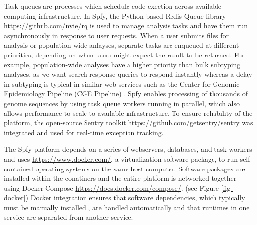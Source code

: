 \documentclass[a4,center,fleqn]{NAR}
\begin{document}
Task queues are processes which schedule code exection across available computing infrastructure.
In Spfy, the Python-based Redis Queue library \url{https://github.com/nvie/rq} is used to manage analysis tasks and have them run asynchronously in response to user requests.
When a user submits files for analysis or population-wide anlayses, separate tasks are enqueued at different priorities, depending on when users might expect the result to be returned.
For example, population-wide analyses have a higher priority than bulk subtyping analyses, as we want search-response queries to respond instantly whereas a delay in subtyping is typical in similar web services such as the Center for Genomic Epidemiology Pipeline (CGE Pipeline) \cite{thomsen2016bacterial}.
Spfy enables processing of thousands of genome sequences by using task queue workers running in parallel, which also allows performance to scale to available infrastructure.
To ensure reliability of the platform, the open-source Sentry toolkit \url{https://github.com/getsentry/sentry} was integrated and used for real-time exception tracking.



The Spfy platform depends on a series of webservers, databases, and task workers and uses \url{https://www.docker.com/}, a virtualization software package, to run self-contained operating systems on the same host computer.
Software packages are installed within the conatiners and the entire platform is networked together using Docker-Compose \url{https://docs.docker.com/compose/}.
(see Figure \ref{fig-docker})
Docker integration ensures that software dependencies, which typically must be manually installed \cite{doi:10.1093/bioinformatics/btu153,laing2010pan,inouye2014srst2,naccache2014cloud}, are handled automatically and that runtimes in one service are separated from another service.
\end{document}
